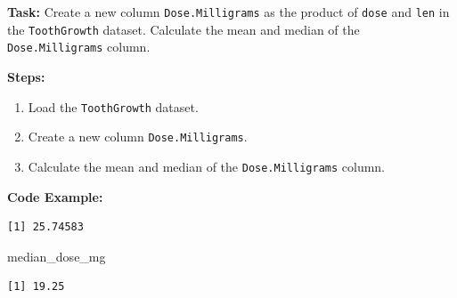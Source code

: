 \documentclass[
  letterpaper,
  DIV=11,
  numbers=noendperiod]{scrreprt}
\newenvironment{Shaded}{\begin{snugshade}}{\end{snugshade}}
\newcommand{\AttributeTok}[1]{\textcolor[rgb]{0.40,0.45,0.13}{#1}}
\newcommand{\CommentTok}[1]{\textcolor[rgb]{0.37,0.37,0.37}{#1}}
\newcommand{\FunctionTok}[1]{\textcolor[rgb]{0.28,0.35,0.67}{#1}}
\newcommand{\NormalTok}[1]{\textcolor[rgb]{0.00,0.23,0.31}{#1}}
\newcommand{\OtherTok}[1]{\textcolor[rgb]{0.00,0.23,0.31}{#1}}
\newcommand{\SpecialCharTok}[1]{\textcolor[rgb]{0.37,0.37,0.37}{#1}}
\providecommand{\tightlist}{%
  \setlength{\itemsep}{0pt}\setlength{\parskip}{0pt}}\usepackage{longtable,booktabs,array}
\begin{document}
\textbf{Task:} Create a new column \texttt{Dose.Milligrams} as the
product of \texttt{dose} and \texttt{len} in the \texttt{ToothGrowth}
dataset. Calculate the mean and median of the \texttt{Dose.Milligrams}
column.

\textbf{Steps:}

\begin{enumerate}
\def\labelenumi{\arabic{enumi}.}
\tightlist
\item
  Load the \texttt{ToothGrowth} dataset.
\item
  Create a new column \texttt{Dose.Milligrams}.
\item
  Calculate the mean and median of the \texttt{Dose.Milligrams} column.
\end{enumerate}

\textbf{Code Example:}

\begin{Shaded}
\end{Shaded}

\begin{verbatim}
[1] 25.74583
\end{verbatim}

\begin{Shaded}
\begin{Highlighting}[]
\NormalTok{median\_dose\_mg}
\end{Highlighting}
\end{Shaded}

\begin{verbatim}
[1] 19.25
\end{verbatim}
\end{document}
